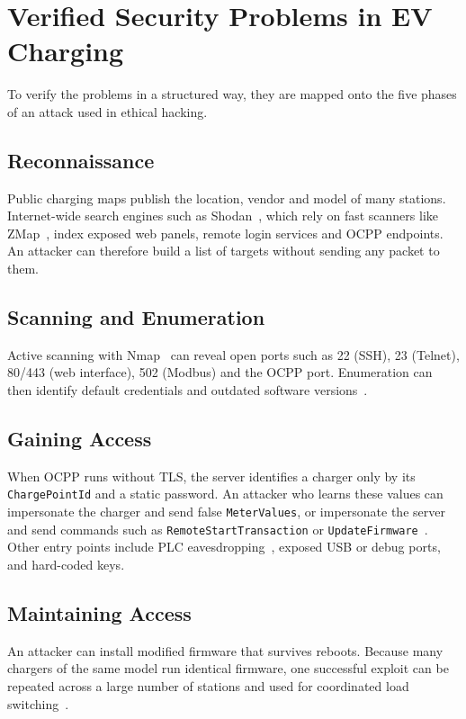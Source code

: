 \documentclass[runningheads]{llncs}
\begin{document}
\section{Verified Security Problems in EV Charging}
To verify the problems in a structured way, they are mapped onto the five phases of an attack used in ethical hacking.

\subsection{Reconnaissance}
Public charging maps publish the location, vendor and model of many stations. Internet-wide search engines such as Shodan~\cite{matherly2015shodan}, which rely on fast scanners like ZMap~\cite{durumeric2013zmap}, index exposed web panels, remote login services and OCPP endpoints. An attacker can therefore build a list of targets without sending any packet to them.

\subsection{Scanning and Enumeration}
Active scanning with Nmap~\cite{lyon2009nmap} can reveal open ports such as 22 (SSH), 23 (Telnet), 80/443 (web interface), 502 (Modbus) and the OCPP port. Enumeration can then identify default credentials and outdated software versions~\cite{gottumukkala2019cyber}.

\subsection{Gaining Access}
When OCPP runs without TLS, the server identifies a charger only by its \texttt{ChargePointId} and a static password. An attacker who learns these values can impersonate the charger and send false \texttt{MeterValues}, or impersonate the server and send commands such as \texttt{RemoteStartTransaction} or \texttt{UpdateFirmware}~\cite{alcaraz2017ocpp}. Other entry points include PLC eavesdropping~\cite{baker2019losing}, exposed USB or debug ports, and hard-coded keys.

\subsection{Maintaining Access}
An attacker can install modified firmware that survives reboots. Because many chargers of the same model run identical firmware, one successful exploit can be repeated across a large number of stations and used for coordinated load switching~\cite{johnson2022review}.
\end{document}
